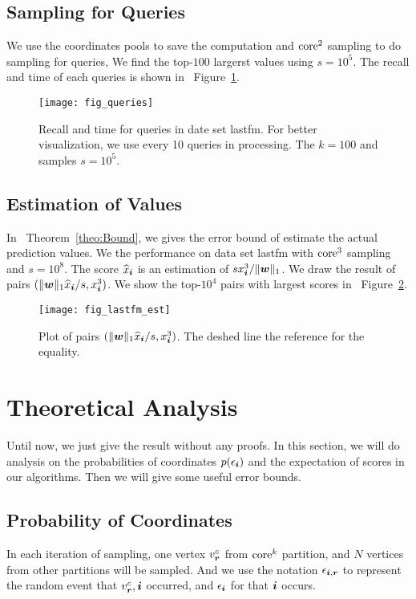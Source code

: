 \documentclass[letterpaper]{article}
\newcommand{\V}[1]{{\bm{{\MakeLowercase{#1}}}}}
\newcommand{\norm}[2]{\|#1\|_{#2}}
\newcommand{\Fig}[1]   {Figure~\ref{fig:#1}}
\newcommand{\Theo}[1] {Theorem~\ref{theo:#1}}
\begin{document}
\subsection{Sampling for Queries}
We use the coordinates pools to save the computation and ${\rm core}^2$ sampling
to do sampling for queries,
We find the top-$100$ largerst values using $s=10^5$.
The recall and time of each queries is shown in ~\Fig{Queries}.
\begin{figure}[t]
  \centering
  \texttt{[image: fig\_queries]}\\
  \caption{Recall and time for queries in date set lastfm.
           For better visualization,
           we use every 10 queries in processing.
           The $k=100$ and samples $s=10^5$.}
  \label{fig:Queries}
\end{figure}
\subsection{Estimation of Values}
In ~\Theo{Bound}, we gives the error bound of estimate the actual prediction values.
We the performance on data set lastfm with ${\rm core}^3$ sampling and $s=10^8$.
The score $\widehat{x}_{\V{i}}$ is an estimation of $sx^3_{\V{i}}/\norm{\V{w}}{1}$.
We draw the result of pairs $(\norm{\V{w}}{1}\widehat{x}_{\V{i}}/s,x^3_{\V{i}})$.
We show the top-$10^4$ pairs with largest scores in ~\Fig{Est}.
\begin{figure}[t]
  \centering
  \texttt{[image: fig\_lastfm\_est]}\\
  \caption{Plot of pairs $(\norm{\V{w}}{1}\widehat{x}_{\V{i}}/s,x^3_{\V{i}})$.
          The deshed line the reference for the equality.}
  \label{fig:Est}
\end{figure}
\section{Theoretical Analysis}

Until now, we just give the result without any proofs.
In this section,
we will do analysis on the probabilities of coordinates $p(\epsilon_{\V{i}})$
and the expectation of scores in our algorithms.
Then we will give some useful error bounds.

\subsection{Probability of Coordinates}
In each iteration of sampling, one vertex $v^c_{\V{r}}$ from ${\rm core}^k$ partition,
and $N$ vertices from other partitions will be sampled.
And we use the notation $\epsilon_{\V{i},\V{r}}$ to represent the random event
that $v^c_{\V{r}},\V{i}$ occurred,
and $\epsilon_{\V{i}}$ for that $\V{i}$ occurs.
\end{document}
